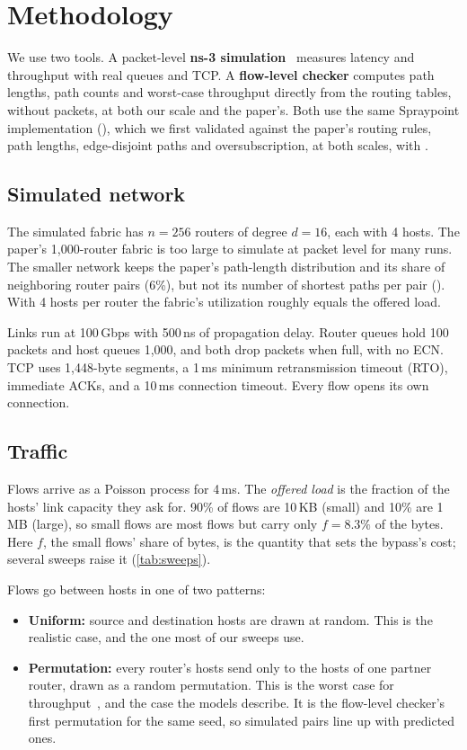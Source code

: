 \section{Methodology}
\label{sec:method}

We use two tools. A packet-level \textbf{ns-3 simulation}~\cite{ns3} measures latency and throughput with real queues and TCP. A \textbf{flow-level checker} computes path lengths, path counts and worst-case throughput directly from the routing tables, without packets, at both our scale and the paper's. Both use the same Spraypoint implementation (), which we first validated against the paper's routing rules, path lengths, edge-disjoint paths and oversubscription, at both scales, with .

\subsection{Simulated network}

The simulated fabric has $n = 256$ routers of degree $d = 16$, each with 4 hosts. The paper's 1{,}000-router fabric is too large to simulate at packet level for many runs. The smaller network keeps the paper's path-length distribution and its share of neighboring router pairs (6\%), but not its number of shortest paths per pair (). With 4 hosts per router the fabric's utilization roughly equals the offered load.

Links run at 100\,Gbps with 500\,ns of propagation delay. Router queues hold 100 packets and host queues 1{,}000, and both drop packets when full, with no ECN. TCP uses 1{,}448-byte segments, a 1\,ms minimum retransmission timeout (RTO), immediate ACKs, and a 10\,ms connection timeout. Every flow opens its own connection.

\subsection{Traffic}

Flows arrive as a Poisson process for 4\,ms. The \emph{offered load} is the fraction of the hosts' link capacity they ask for. 90\% of flows are 10\,KB (small) and 10\% are 1\,MB (large), so small flows are most flows but carry only $f = 8.3\%$ of the bytes. Here $f$, the small flows' share of bytes, is the quantity that sets the bypass's cost; several sweeps raise it (\autoref{tab:sweeps}).

Flows go between hosts in one of two patterns:
\begin{itemize}
  \item \textbf{Uniform:} source and destination hosts are drawn at random. This is the realistic case, and the one most of our sweeps use.
  \item \textbf{Permutation:} every router's hosts send only to the hosts of one partner router, drawn as a random permutation. This is the worst case for throughput~\cite{namyar}, and the case the models describe. It is the flow-level checker's first permutation for the same seed, so simulated pairs line up with predicted ones.
\end{itemize}

